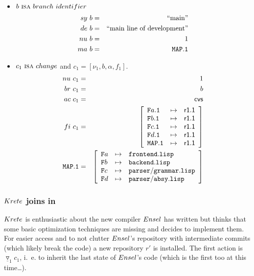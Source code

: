 \documentclass[fleqn, 10pt, a4paper]{article}
\begin{document}
\begin{itemize}
\item $b\ \mbox{\textsc{isa}}\ \mathnormal{branch\ identifier}$
\begin{eqnarray*}
\mathnormal{sy}\ b &=& \mbox{``main''} \\
\mathnormal{de}\ b &=& \mbox{``main line of development''} \\
\mathnormal{nu}\ b &=& 1 \\
\mathnormal{ma}\ b &=& \mathtt{MAP.1}
\end{eqnarray*}

\item $c_1\ \mbox{\textsc{isa}}\ \mathnormal{change}$ and
$c_1=[\nu_1, b, \alpha, f_1]$.
\begin{eqnarray*}
\mathnormal{nu}\ c_1 &=& 1 \\
\mathnormal{br}\ c_1 &=& b \\
\mathnormal{ac}\ c_1 &=& \mathsf{cvs} \\
\mathnormal{fi}\ c_1 &=& \left[
\begin{array}{lcl}
\mathtt{F}a\mathtt{.1} & \mapsto & \mathsf{r1.1} \\
\mathtt{F}b\mathtt{.1} & \mapsto & \mathsf{r1.1} \\
\mathtt{F}c\mathtt{.1} & \mapsto & \mathsf{r1.1} \\
\mathtt{F}d\mathtt{.1} & \mapsto & \mathsf{r1.1} \\
\mathtt{MAP.1}         & \mapsto & \mathsf{r1.1} \\
\end{array}\right] \\
\mathtt{MAP.1} &=& \left[
\begin{array}{lcl}
\mathtt{F}a &\mapsto& \mathtt{frontend.lisp} \\
\mathtt{F}b &\mapsto& \mathtt{backend.lisp} \\
\mathtt{F}c &\mapsto& \mathtt{parser/grammar.lisp} \\
\mathtt{F}d &\mapsto& \mathtt{parser/absy.lisp} \\
\end{array}\right]
\end{eqnarray*}
\end{itemize}

\subsubsection{$\mathnormal{Krete}$ joins in}

$\mathnormal{Krete}$ is enthusiastic about the new compiler
$\mathnormal{Ensel}$ has written but thinks that some basic
optimization techniques are missing and decides to implement
them. For easier access and to not clutter $\mathnormal{Ensel}$'s
repository with intermediate commits (which likely break the code)
a new repository $r'$ is installed. The first action is
$\underline{\triangledown}_1 c_1$, i.~e. to inherit the last
state of $\mathnormal{Ensel}$'s code (which is the first too at
this time\ldots).
\end{document}
